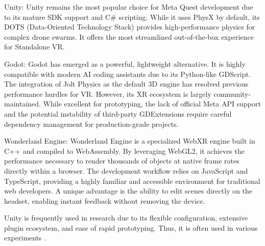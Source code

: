 Unity: Unity remains the most popular choice for Meta Quest development due to its mature SDK support and C\# scripting. While it uses PhysX by default, its DOTS (Data-Oriented Technology Stack) provides high-performance physics for complex drone swarms. It offers the most streamlined out-of-the-box experience for Standalone VR.

Godot: Godot has emerged as a powerful, lightweight alternative. It is highly compatible with modern AI coding assistants due to its Python-like GDScript. The integration of Jolt Physics as the default 3D engine has resolved previous performance hurdles for VR. However, its XR ecosystem is largely community-maintained. While excellent for prototyping, the lack of official Meta API support and the potential instability of third-party GDExtensions require careful dependency management for production-grade projects.

Wonderland Engine: Wonderland Engine is a specialized WebXR engine built in C++ and compiled to WebAssembly.  By leveraging WebGL2, it achieves the performance necessary to render thousands of objects at native frame rates directly within a browser. The development workflow relies on JavaScript and TypeScript, providing a highly familiar and accessible environment for traditional web developers. A unique advantage is the ability to edit scenes directly on the headset, enabling instant feedback without removing the device.

Unity is frequently used in research due to its flexible configuration, extensive plugin ecosystem, and ease of rapid prototyping. Thus, it is often used in various experiments \parencite{shatokhin_extended_2025}.

